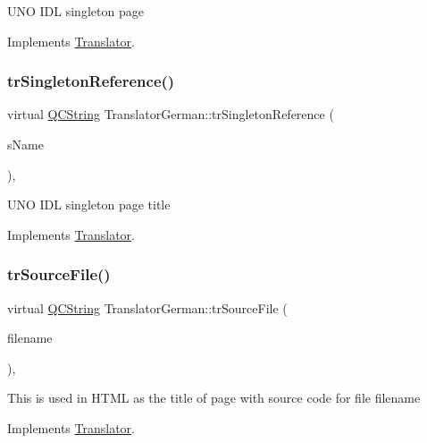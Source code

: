 U\+NO I\+DL singleton page 

Implements \mbox{\hyperlink{class_translator}{Translator}}.

\mbox{\label{class_translator_german_a27bf47f55aeaa123001294c7d72e4452}} 
\subsubsection{\texorpdfstring{trSingletonReference()}{trSingletonReference()}}
{\footnotesize\ttfamily virtual \mbox{\hyperlink{class_q_c_string}{Q\+C\+String}} Translator\+German\+::tr\+Singleton\+Reference (\begin{DoxyParamCaption}\item[{const char $\ast$}]{s\+Name }\end{DoxyParamCaption})\hspace{0.3cm}{\ttfamily [inline]}, {\ttfamily [virtual]}}

U\+NO I\+DL singleton page title 

Implements \mbox{\hyperlink{class_translator}{Translator}}.

\mbox{\label{class_translator_german_a705bf582f775888df4a792c333718abf}} 
\subsubsection{\texorpdfstring{trSourceFile()}{trSourceFile()}}
{\footnotesize\ttfamily virtual \mbox{\hyperlink{class_q_c_string}{Q\+C\+String}} Translator\+German\+::tr\+Source\+File (\begin{DoxyParamCaption}\item[{\mbox{\hyperlink{class_q_c_string}{Q\+C\+String}} \&}]{filename }\end{DoxyParamCaption})\hspace{0.3cm}{\ttfamily [inline]}, {\ttfamily [virtual]}}

This is used in H\+T\+ML as the title of page with source code for file filename 

Implements \mbox{\hyperlink{class_translator}{Translator}}.

